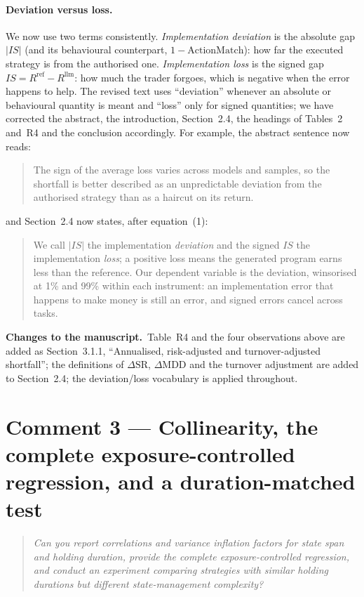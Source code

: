 \documentclass[11pt,a4paper]{article}
\newenvironment{reviewer}{\par\medskip\noindent\begin{quote}\itshape}{\end{quote}\par}
\newcommand{\changes}{\par\medskip\noindent\textbf{Changes to the manuscript.}\ }
\newenvironment{newtext}{\par\medskip\noindent\begin{quote}\small\color{blue!60!black}}{\end{quote}\par}
\begin{document}
\paragraph{Deviation versus loss.} We now use two terms consistently. \emph{Implementation deviation} is the absolute gap $|IS|$ (and its behavioural counterpart, $1-\mathrm{ActionMatch}$): how far the executed strategy is from the authorised one. \emph{Implementation loss} is the signed gap $IS=R^{\mathrm{ref}}-R^{\mathrm{llm}}$: how much the trader forgoes, which is negative when the error happens to help. The revised text uses ``deviation'' whenever an absolute or behavioural quantity is meant and ``loss'' only for signed quantities; we have corrected the abstract, the introduction, Section~2.4, the headings of Tables~2 and~R4 and the conclusion accordingly. For example, the abstract sentence now reads:
\begin{newtext}
The sign of the average loss varies across models and samples, so the shortfall is better described as an unpredictable deviation from the authorised strategy than as a haircut on its return.
\end{newtext}
and Section~2.4 now states, after equation~(1):
\begin{newtext}
We call $|IS|$ the implementation \emph{deviation} and the signed $IS$ the implementation \emph{loss}; a positive loss means the generated program earns less than the reference. Our dependent variable is the deviation, winsorised at 1\% and 99\% within each instrument: an implementation error that happens to make money is still an error, and signed errors cancel across tasks.
\end{newtext}

\changes Table~R4 and the four observations above are added as Section~3.1.1, ``Annualised, risk-adjusted and turnover-adjusted shortfall''; the definitions of $\Delta\mathrm{SR}$, $\Delta\mathrm{MDD}$ and the turnover adjustment are added to Section~2.4; the deviation/loss vocabulary is applied throughout.

\section*{Comment 3 --- Collinearity, the complete exposure-controlled regression, and a duration-matched test}
\begin{reviewer}
Can you report correlations and variance inflation factors for state span and holding duration, provide the complete exposure-controlled regression, and conduct an experiment comparing strategies with similar holding durations but different state-management complexity?
\end{reviewer}
\end{document}
